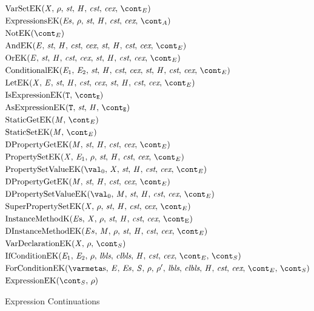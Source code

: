 \documentclass[a4paper,oneside]{article}
\begin{document}
\begin{figure}[Htp]
  \begin{eqfigure}
  \begin{align}
    &\VarSetK{\idmeta}{\env}{\ExceptionHandlers}{\econt} \label{econt:varset}\\
    &\ExpressionsK{\exprs}{\env}{\acont} \label{econt:expressions}\\
    &\NotK{\econt} \label{econt:not}\\
    &\AndK{\expressionmeta}{\ExceptionHandlers}{\econt} \label{econt:and}\\
    &\OrK{\expressionmeta}{\ExceptionHandlers}{\econt} \label{econt:or}\\
    &\ConditionalK{\expressionmeta_1}{\expressionmeta_2}{\ExceptionHandlers}{\econt} \label{econt:cond}\\
    &\LetK{\idmeta}{\expressionmeta}{\ExceptionHandlers}{\econt} \label{econt:let}\\
    &\IsExpressionK \label{econt:is}\\
    &\AsExpressionK \label{econt:as}\\
    &\StaticGetK \label{econt:static-get}\\
    &\StaticSetK \label{econt:static-set}\\
    &\DPropertyGetK \label{econt:dproperty-get}\\
    &\PropertySetK \label{econt:property-set}\\
    &\PropertySetVK \label{econt:property-set}\\
    &\DPropertyGetK \label{econt:dproperty-set}\\
    &\DPropertySetVK \label{econt:dproperty-set-v}\\
    &\SuperPropertySetK \label{econt:super-property-set}\\
    &\InstanceMethodK{\strace} \label{econt:instance-method}\\
    &\DInstanceMethodK{\strace} \label{econt:dinstance-method}\\
    &\VarDeclK{\idmeta}{\env}{\scont} \label{econt:var-decl}\\
    &\IfCondK{\expressionmeta_1}{\expressionmeta_2} \label{econt:if-cond}\\
    &\ForCondK \label{econt:for-cond}\\
    &\ExpressionK{\scont}{\env} \label{econt:expression}
  \end{align}
  \caption{Expression Continuations}
  \label{figure:econts}
  \end{eqfigure}
\end{figure}
\end{document}
